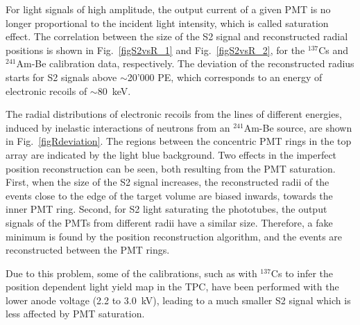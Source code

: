 For light signals of high amplitude, the output current of a given PMT is no longer proportional to the incident light intensity, which is called saturation effect. The correlation between the size of the S2 signal and reconstructed radial positions is shown in Fig.~\ref{figS2vsR_1} and Fig.~\ref{figS2vsR_2}, for the $^{137}$Cs and $^{241}$Am-Be calibration data, respectively. The deviation of the reconstructed radius starts for S2 signals above $\sim$20'000  PE, which corresponds to an energy of electronic recoils of $\sim$80~keV.

The radial distributions of electronic recoils from the lines of different energies, induced by inelastic interactions of neutrons from an $^{241}$Am-Be source, are shown in Fig.~\ref{figRdeviation}. The regions between the concentric PMT rings in the top array are indicated by  the light blue background. Two effects in the imperfect position reconstruction can be seen, both resulting from the PMT saturation. 
First, when the size of the S2 signal increases, the reconstructed radii of the events close to the edge of the target volume are biased inwards, towards the inner PMT ring. Second, for S2 light saturating the phototubes, the output signals of the PMTs from different radii have a similar size. Therefore, a fake minimum is found by the position reconstruction algorithm, and the events are reconstructed between the PMT rings.

Due to this problem, some of the calibrations, such as with $^{137}$Cs to infer the position dependent light yield map in the TPC, have been performed with the lower anode voltage (2.2 to 3.0~kV), leading to a much smaller S2 signal which is less affected by PMT saturation.




